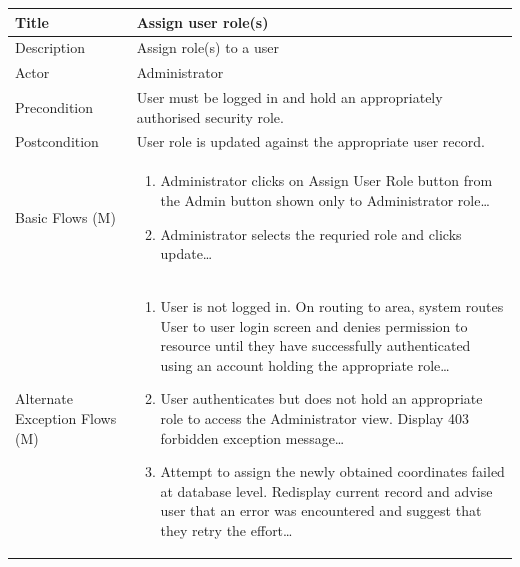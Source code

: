 \documentclass[a4paper,12pt]{article}
\newcommand\addrow[2]{#1 &#2\\ }
\newcommand\addheading[2]{#1 &#2\\ \hline}
\newcommand\tabularhead{\begin{tabular}{lp{11cm}}
\hline
}
\newcommand\addmulrow[2]{ \begin{minipage}[t][][t]{3cm}#1\end{minipage}%
   &\begin{minipage}[t][][t]{11cm}
    \begin{enumerate} #2   \end{enumerate}
    \end{minipage}\\ }
\newenvironment{usecase}{\tabularhead}
{\hline\end{tabular}}
\begin{document}
\begin{samepage}
\begin{usecase}
    \addheading{Title}{Assign user role(s) }
  \addheading{Description}{Assign role(s) to a user}
  \addheading{Actor}{Administrator} 
  \addrow{Precondition}{User must be logged in and hold an appropriately authorised security role.}
  \addrow{Postcondition}{User role is updated against the appropriate user record.}
  \addmulrow{Basic Flows (M)}{\item Administrator clicks on Assign User Role button from the Admin button shown only to Administrator role\ldots
  \newpage
  \item Administrator selects the requried role and clicks update\ldots}
  \addmulrow{Alternate Exception Flows (M)}{\item User is not logged in. On routing to area, system routes User to user login screen and denies permission to resource until they have successfully authenticated using an account holding the appropriate role\ldots
                                                                      \item User authenticates but does not hold an appropriate role to access the Administrator  view. Display 403 forbidden exception message\ldots
                                                                      \item Attempt to assign the newly obtained coordinates failed at database level. Redisplay current record and advise user that an error was encountered and suggest that they retry the effort\ldots}
\end{usecase}


\end{samepage}
\end{document}
